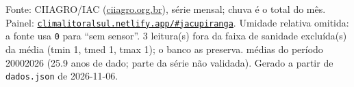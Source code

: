 \documentclass[10pt,a4paper]{article}
\begin{document}
\vspace{1pt}
{\tiny\color{cinza}
Fonte: CIIAGRO/IAC (\href{http://ciiagro.org.br}{ciiagro.org.br}), série mensal;
chuva é o total do mês. Painel:
\href{https://climalitoralsul.netlify.app/\#jacupiranga}%
{\texttt{climalitoralsul.netlify.app/\#jacupiranga}}.
Umidade relativa omitida: a fonte usa \texttt{0} para ``sem sensor''.  3 leitura(s) fora da faixa de sanidade excluída(s) da média (tmin 1, tmed 1, tmax 1); o banco as preserva.
médias do período 2000\textendash{}2026 (25.9 anos de dado; parte da série não validada).
Gerado a partir de \texttt{dados.json} de 2026-11-06.}
\end{document}
